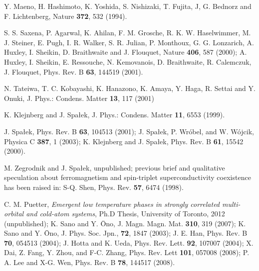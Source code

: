 \documentclass[aps,prb,showpacs,reprint]{revtex4-1}
\begin{document}
\begin{thebibliography}{99}

Y. Maeno, H. Hashimoto, K. Yoshida, S. Nishizaki, T.
Fujita, J, G. Bednorz and
F. Lichtenberg, Nature {\bf 372}, 532 (1994).

S. S. Saxena, P. Agarwal, K. Ahilan, F. M. Grosche, R.
K. W. Haselwimmer, M. J.
Steiner, E. Pugh, I. R. Walker, S. R. Julian, P. Monthoux, G. G. Lonzarich, A.
Huxley, I. Sheikin, D. Braithwaite and J. Flouquet, Nature {\bf 406}, 587
(2000); \newline
A. Huxley, I. Sheikin, E. Ressouche, N. Kemovanois, D. Braithwaite, R.
Calemczuk, J. Flouquet, Phys. Rev. B {\bf 63}, 144519 (2001).

N. Tateiwa, T. C. Kobayashi, K. Hanazono, K. Amaya, Y.
Haga, R. Settai and Y.
Onuki, J. Phys.: Condens. Matter {\bf 13}, 117 (2001)

K. Klejnberg and J. Spa\l ek, J. Phys.: Condens. Matter {\bf 11}, 6553 (1999).

J. Spa\l ek, Phys. Rev. B {\bf 63}, 104513 (2001);\newline
J. Spa\l ek, P. Wr\'{o}bel, and W. W\'{o}jcik, Physica C {\bf 387}, 1
(2003);\newline
K. Klejnberg and J. Spa\l ek, Phys. Rev. B {\bf 61}, 15542 (2000).

M. Zegrodnik and J. Spa\l ek, unpublished; \newline
previous brief and qualitative speculation about ferromagnetism and spin-triplet superconductivity coexistence has been raised in: S-Q. Shen, Phys. Rev. {\bf 57}, 6474 (1998).

C. M. Puetter, \textit{Emergent low temperature phases in strongly correlated
multi-orbital and cold-atom systems}, Ph.D Thesis, University of Toronto, 2012
(unpublished); K. Sano and Y. \=Ono, J. Magn. Magn. Mat. {\bf 310}, 319 (2007);
\newline
 K. Sano and Y. \=Ono, J. Phys. Soc. Jpn., {\bf 72}, 1847 (2003);\newline
J. E. Han, Phys. Rev. B {\bf 70}, 054513 (2004);\newline
J. Hotta and K. Ueda, Phys. Rev. Lett. {\bf 92}, 107007 (2004); \newline
X. Dai, Z. Fang, Y. Zhou, and F-C. Zhang, Phys. Rev. Lett {\bf 101}, 057008 (2008);\newline
P. A. Lee and X-G. Wen, Phys. Rev. B {\bf 78}, 144517 (2008).


\end{thebibliography}
\end{document}
